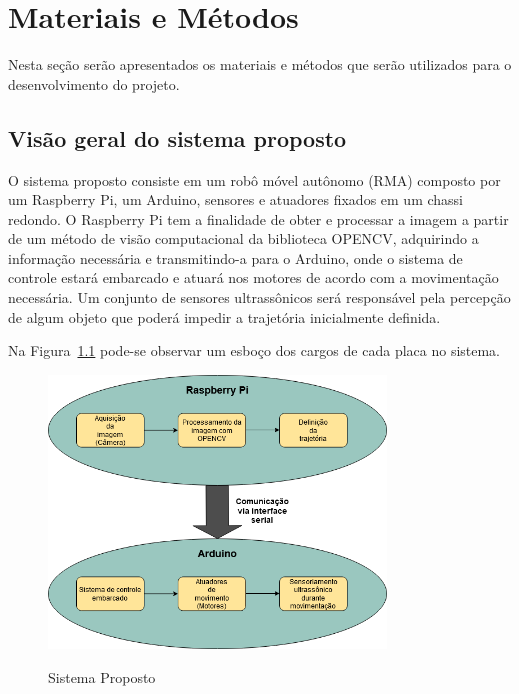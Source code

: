 \chapter{Materiais e Métodos}
\label{chap:mat_met}

Nesta seção serão apresentados os materiais e métodos que serão utilizados para o desenvolvimento do projeto.

\section{Visão geral do sistema proposto}
\label{sec:visaoGeralSist}

O sistema proposto consiste em um robô móvel autônomo (RMA) composto por um Raspberry Pi, um Arduino, sensores e atuadores fixados em um chassi redondo. O Raspberry Pi tem a finalidade de obter e processar a imagem a partir de um método de visão computacional da biblioteca OPENCV, adquirindo a informação necessária e transmitindo-a para o Arduino, onde o sistema de controle estará embarcado e atuará nos motores de acordo com a movimentação necessária. Um conjunto de sensores ultrassônicos será responsável pela percepção de algum objeto que poderá impedir a trajetória inicialmente definida.

Na Figura~\ref{fig:sistema-proposto} pode-se observar um esboço dos cargos de cada placa no sistema.

\begin{figure}[!hbtp]
  \centering
   \caption{Sistema Proposto}
    \includegraphics[width = 0.8\textwidth]{Caps/Figs/mat-met/Sistema-proposto.png}
   \label{fig:sistema-proposto}
\end{figure}


